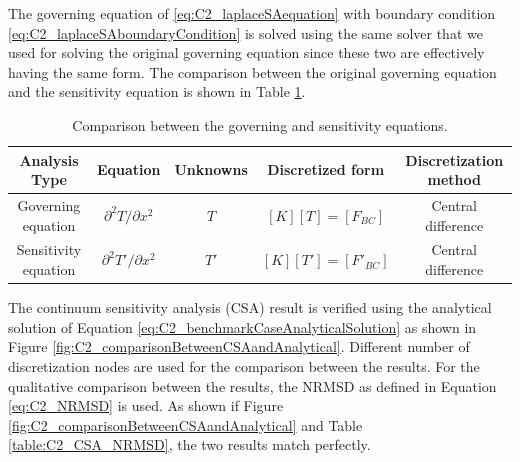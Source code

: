The governing equation of \eqref{eq:C2_laplaceSAequation} with boundary condition \eqref{eq:C2_laplaceSAboundaryCondition} is solved using the same solver that we used for solving the original governing equation since these two are effectively having the same form. The comparison between the original governing equation and the sensitivity equation is shown in Table \ref{table:C2_comparisonBetweenGEandSA}.

\begin{center}
\begin{table}[h]
\begin{tabular}{| c | c | c | c | c |}
	\hline
	Analysis Type & Equation & Unknowns & Discretized form & Discretization method \\ \hline \hline
	Governing equation & $\partial^2 T/\partial x^2$ & $T$ & $[K][T] = [F_{BC}]$ & Central difference \\ \hline
	Sensitivity equation & $\partial^2 T'/\partial x^2$ & $T'$ & $[K][T'] = [F'_{BC}]$ & Central difference \\ \hline
\end{tabular}
\caption{Comparison between the governing and sensitivity equations.}
\label{table:C2_comparisonBetweenGEandSA}
\end{table}
\end{center}

The continuum sensitivity analysis (CSA) result is verified using the analytical solution of Equation \eqref{eq:C2_benchmarkCaseAnalyticalSolution} as shown in Figure \ref{fig:C2_comparisonBetweenCSAandAnalytical}. Different number of discretization nodes are used for the comparison between the results. For the qualitative comparison between the results, the NRMSD as defined in Equation \eqref{eq:C2_NRMSD} is used. As shown if Figure \ref{fig:C2_comparisonBetweenCSAandAnalytical} and Table \ref{table:C2_CSA_NRMSD}, the two results match perfectly.

